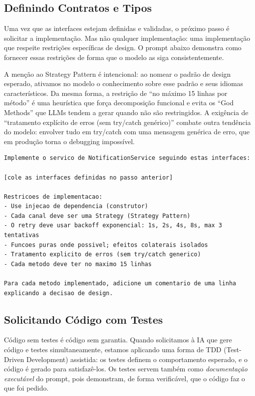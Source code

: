 \subsection{Definindo Contratos e Tipos}

Uma vez que as interfaces estejam definidas e validadas, o próximo passo é solicitar
a implementação. Mas não qualquer implementação: uma implementação que respeite
restrições específicas de design. O prompt abaixo demonstra como fornecer essas
restrições de forma que o modelo as siga consistentemente.

A menção ao Strategy Pattern é intencional: ao nomear o padrão de design
esperado, ativamos no modelo o conhecimento sobre esse padrão e seus idiomas
característicos. Da mesma forma, a restrição de ``no máximo 15 linhas por
método'' é uma heurística que força decomposição funcional e evita os ``God
Methods'' que LLMs tendem a gerar quando não são restringidos. A exigência de
``tratamento explícito de erros (sem try/catch genérico)'' combate outra
tendência do modelo: envolver tudo em try/catch com uma mensagem genérica de
erro, que em produção torna o debugging impossível.

\begin{lstlisting}[language={}, caption={Prompt para geração de código com contratos tipados}]
Implemente o servico de NotificationService seguindo estas interfaces:

[cole as interfaces definidas no passo anterior]

Restricoes de implementacao:
- Use injecao de dependencia (construtor)
- Cada canal deve ser uma Strategy (Strategy Pattern)
- O retry deve usar backoff exponencial: 1s, 2s, 4s, 8s, max 3 tentativas
- Funcoes puras onde possivel; efeitos colaterais isolados
- Tratamento explicito de erros (sem try/catch generico)
- Cada metodo deve ter no maximo 15 linhas

Para cada metodo implementado, adicione um comentario de uma linha
explicando a decisao de design.
\end{lstlisting}

\subsection{Solicitando Código com Testes}

Código sem testes é código sem garantia. Quando solicitamos à IA que gere código
e testes simultaneamente, estamos aplicando uma forma de TDD (Test-Driven
Development) assistida: os testes definem o comportamento esperado, e o código é
gerado para satisfazê-los. Os testes servem também como
\textit{documentação executável} do prompt, pois demonstram, de forma
verificável, que o código faz o que foi pedido.


